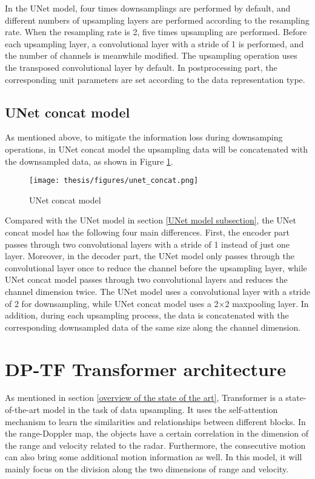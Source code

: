 In the UNet model, four times downsamplings are performed by default, and different numbers of upsampling layers are performed according to the resampling rate. When the resampling rate is 2, five times upsampling are performed. Before each upsampling layer, a convolutional layer with a stride of 1 is performed, and the number of channels is meanwhile modified. The upsampling operation uses the transposed convolutional layer by default. In postprocessing part, the corresponding unit parameters are set according to the data representation type.

\subsection{UNet concat model} \label{UNet concat model subsection}
As mentioned above, to mitigate the information loss during downsamping operations, in UNet concat model the upsampling data will be concatenated with the downsampled data, as shown in Figure \ref{unet_concat model}. 

\begin{figure}
	\centering
	\texttt{[image: thesis/figures/unet\_concat.png]}
	\caption{UNet concat model}
	\label{unet_concat model}
\end{figure}

Compared with the UNet model in section \ref{UNet model subsection}, the UNet concat model has the following four main differences. First, the encoder part passes through two convolutional layers with a stride of 1 instead of just one layer. Moreover, in the decoder part, the UNet model only passes through the convolutional layer once to reduce the channel before the upsampling layer, while UNet concat model passes through two convolutional layers and reduces the channel dimension twice. The UNet model uses a convolutional layer with a stride of 2 for downsampling, while UNet concat model uses a 2$\times$2 maxpooling layer. In addition, during each upsampling process, the data is concatenated with the corresponding downsampled data of the same size along the channel dimension.

\section{DP-TF Transformer architecture} \label{dp-tf transformer architecture}
As mentioned in section \ref{overview of the state of the art}, Transformer is a state-of-the-art model in the task of data upsampling. It uses the self-attention mechanism to learn the similarities and relationships between different blocks. In the range-Doppler map, the objects have a certain correlation in the dimension of the range and velocity related to the radar. Furthermore, the consecutive motion can also bring some additional motion information as well. In this model, it will mainly focus on the division along the two dimensions of range and velocity.

